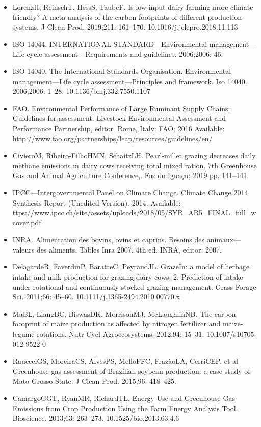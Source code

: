 \documentclass[11pt,a4paper]{article}
\begin{document}
\begin{itemize}
\item LorenzH, ReinschT, HessS, TaubeF. Is low-input dairy farming more climate friendly? A meta-analysis of the carbon footprints of different production systems. J Clean Prod. 2019;211: 161–170. 10.1016/j.jclepro.2018.11.113
\item ISO 14044. INTERNATIONAL STANDARD—Environmental management—Life cycle assessment—Requirements and guidelines. 2006;2006: 46.
\item ISO 14040. The International Standards Organisation. Environmental management—Life cycle assessment—Principles and framework. Iso 14040. 2006;2006: 1–28. 10.1136/bmj.332.7550.1107
\item FAO. Environmental Performance of Large Ruminant Supply Chains: Guidelines for assessment. Livestock Environmental Assessment and Performance Partnership, editor. Rome, Italy: FAO; 2016 Available: http://www.fao.org/partnerships/leap/resources/guidelines/en/
\item CivieroM, Ribeiro-FilhoHMN, SchaitzLH. Pearl-millet grazing decreases daily methane emissions in dairy cows receiving total mixed ration. 7th Greenhouse Gas and Animal Agriculture Conference,. Foz do Iguaçu; 2019 pp. 141–141.
\item IPCC—Intergovernmental Panel on Climate Change. Climate Change 2014 Synthesis Report (Unedited Version). 2014. Available: ttps://www.ipcc.ch/site/assets/uploads/2018/05/SYR\_AR5\_FINAL\_full\_wcover.pdf
\item INRA. Alimentation des bovins, ovins et caprins. Besoins des animaux—valeurs des aliments. Tables Inra 2007. 4th ed. INRA, editor. 2007.
\item DelagardeR, FaverdinP, BaratteC, PeyraudJL. GrazeIn: a model of herbage intake and milk production for grazing dairy cows. 2. Prediction of intake under rotational and continuously stocked grazing management. Grass Forage Sci. 2011;66: 45–60. 10.1111/j.1365-2494.2010.00770.x
\item MaBL, LiangBC, BiswasDK, MorrisonMJ, McLaughlinNB. The carbon footprint of maize production as affected by nitrogen fertilizer and maize-legume rotations. Nutr Cycl Agroecosystems. 2012;94: 15–31. 10.1007/s10705-012-9522-0
\item RauccciGS, MoreiraCS, AlvesPS, MelloFFC, FrazãoLA, CerriCEP, et al Greenhouse gas assessment of Brazilian soybean production: a case study of Mato Grosso State. J Clean Prod. 2015;96: 418–425.
\item CamargoGGT, RyanMR, RichardTL. Energy Use and Greenhouse Gas Emissions from Crop Production Using the Farm Energy Analysis Tool. Bioscience. 2013;63: 263–273. 10.1525/bio.2013.63.4.6

\end{itemize}
\end{document}
